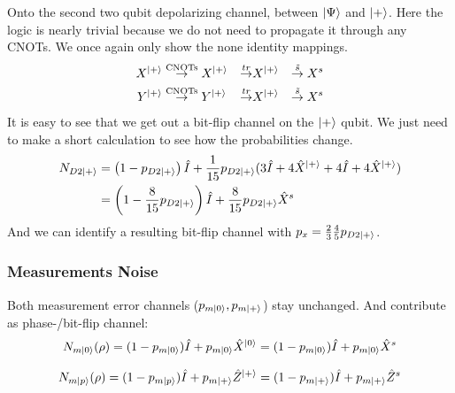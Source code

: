 Onto the second two qubit depolarizing channel, between $\ket{\Psi}$ and $\ket{+}$.
Here the logic is nearly trivial because we do not need to propagate it through any CNOTs.
We once again only show the none identity mappings.
\begin{align*}
    X^{\ket{+}} 
    &\overset{\text{CNOTs}}{\rightarrow} X^{\ket{+}}  
    &\overset{tr}{\rightarrow} & X^{\ket{+}} 
    &\overset{\tilde{s}}{\rightarrow} X^s  \\
    Y^{\ket{+}} 
    &\overset{\text{CNOTs}}{\rightarrow} Y^{\ket{+}} 
    &\overset{tr}{\rightarrow} & X^{\ket{+}} 
    &\overset{\tilde{s}}{\rightarrow} X^s  \\
\end{align*}
It is easy to see that we get out a bit-flip channel on the $\ket{+}$ qubit.
We just need to make a short calculation to see how the probabilities change.
\begin{align*}
    N_{D2\ket{+}} &= \left(1- p_{D2\ket{+}} \right) \hat{I} + \frac{1}{15} p_{D2\ket{+}}(3\hat{I} + 4 \hat{X}^{\ket{+}} + 4\hat{I} + 4 \hat{X}^{\ket{+}}) \\
    &= \left(1- \frac{8}{15} p_{D2\ket{+}} \right) \hat{I} + \frac{8}{15}p_{D2\ket{+}}  \hat{X}^{s}
\end{align*}
And we can identify a resulting bit-flip channel with $p_x = \frac{2}{3}\frac{4}{5}p_{D2\ket{+}}$.


\subsubsection{Measurements Noise}
Both measurement error channels ($p_{m\ket{0}},p_{m\ket{+}}$) stay unchanged.
And contribute as phase-/bit-flip channel:
\begin{equation*}
    N_{m\ket{0}} (\rho) =(1-p_{m\ket{0}})\hat{I} + p_{m\ket{0}} \hat{X}^{\ket{0}} =  (1-p_{m\ket{0}})\hat{I} + p_{m\ket0} \hat{X}^s
\end{equation*}

\begin{equation*}
    N_{m\ket{p}} (\rho) =  (1-p_{m\ket{p}})\hat{I} + p_{m\ket{+}} \hat{Z}^{\ket{+}} = (1-p_{m\ket{+}})\hat{I} + p_{m\ket{+}} \hat{Z}^s
\end{equation*}

